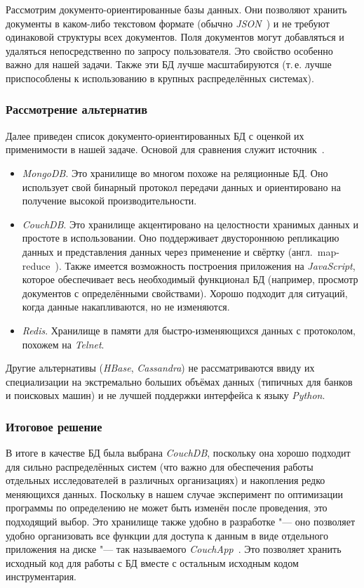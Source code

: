 Рассмотрим документо-ориентированные базы данных. Они позволяют хранить документы в каком-либо текстовом формате (обычно \textit{JSON}~\cite{json}) и не требуют одинаковой структуры всех документов. Поля документов могут добавляться и удаляться непосредственно по запросу пользователя. Это свойство особенно важно для нашей задачи. Также эти БД лучше масштабируются (т.\,е. лучше приспособлены к использованию в крупных распределённых системах).


\subsubsection{Рассмотрение альтернатив}
Далее приведен список документо-ориентированных БД с оценкой их применимости в нашей задаче. Основой для сравнения служит источник~\cite{nosql-comparison}.

\begin{itemize}
    \item \textit{MongoDB}. Это хранилище во многом похоже на реляционные БД. Оно использует свой бинарный протокол передачи данных и ориентировано на получение высокой производительности.
    \item \textit{CouchDB}. Это хранилище акцентировано на целостности хранимых данных и простоте в использовании. Оно поддерживает двустороннюю репликацию данных и представления данных через применение и свёртку (англ.~{map-reduce}~\cite{map-reduce}). Также имеется возможность построения приложения на \textit{JavaScript}, которое обеспечивает весь необходимый функционал БД (например, просмотр документов с определёнными свойствами). Хорошо подходит для ситуаций, когда данные накапливаются, но не изменяются.
    \item \textit{Redis}. Хранилище в памяти для быстро-изменяющихся данных с протоколом, похожем на \textit{Telnet}.
\end{itemize}

Другие альтернативы (\textit{HBase}, \textit{Cassandra}) не рассматриваются ввиду их специализации на экстремально больших объёмах данных (типичных для банков и поисковых машин) и не лучшей поддержки интерфейса к языку \textit{Python}.


\subsubsection{Итоговое решение}
В итоге в качестве БД была выбрана \textit{CouchDB}, поскольку она хорошо подходит для сильно распределённых систем (что важно для обеспечения работы отдельных исследователей в различных организациях) и накопления редко меняющихся данных. Поскольку в нашем случае эксперимент по оптимизации программы по определению не может быть изменён после проведения, это подходящий выбор.
Это хранилище также удобно в разработке "--- оно позволяет удобно организовать все функции для доступа к данным в виде отдельного приложения на диске "--- так называемого \textit{CouchApp}~\cite{couchapp}. Это позволяет хранить исходный код для работы с БД вместе с остальным исходным кодом инструментария.


